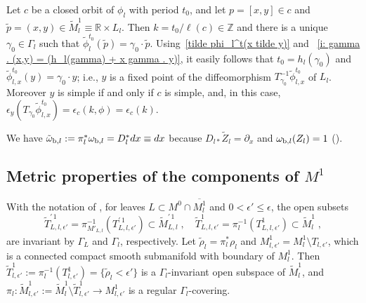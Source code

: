 \documentclass{memo-l}
\theoremstyle{plain}
\theoremstyle{definition}
\theoremstyle{remark}
\newcommand{\R}{\mathbb{R}}
\newcommand{\Z}{\mathbb{Z}}
\numberwithin{section}{chapter}
\numberwithin{equation}{section}%
\begin{document}
Let $c$ be a closed orbit of $\phi_l$ with period $t_0$, and let $p=[x,y]\in c$ and $\tilde p=(x,y)\in\widetilde M^1_l\equiv \R\times L_l$. Then $k=t_0/\ell(c)\in\Z$ and there is a unique $\gamma_0\in\Gamma_l$ such that $\tilde\phi_l^{t_0}(\tilde p)=\gamma_0\cdot\tilde p$. Using~\eqref{tilde phi_l^t(x tilde y)} and ~\ref{i: gamma . (x,y) = (h_l(gamma) + x gamma . y)}, it easily follows that $t_0=h_l(\gamma_0)$ and $\tilde\phi_{l,x}^{t_0}(y)=\gamma_0\cdot y$; i.e., $y$ is a fixed point of the diffeomorphism $T_{\gamma_0}^{-1}\tilde\phi^{t_0}_{l,x}$ of $L_l$. Moreover $y$ is simple if and only if $c$ is simple, and, in this case, $\epsilon_y(T_{\gamma_0}\tilde\phi_{l,x}^{t_0})=\epsilon_c(k,\phi)=\epsilon_c(k)$.

We have $\tilde\omega_{\text{\rm b},l}:=\pi_l^*\omega_{\text{\rm b},l}=D_l^*dx\equiv dx$ because $D_{l*}\widetilde Z_l=\partial_x$ and $\omega_{\text{\rm b},l}(Z_l)=1$ ().



\subsection{Metric properties of the components of $M^1$}\label{ss: metric properties of M^1}

With the notation of , for leaves $L\subset M^0\cap\overline{M^1_l}$ and $0<\epsilon'\le\epsilon$, the open subsets
\[
\widetilde T^{\prime\,1}_{L,l,\epsilon'}=\pi_{M'_{L,l}}^{-1}(T^{\prime\,1}_{L,l,\epsilon'})\subset\widetilde M^{\prime\,1}_{L,l}\;,\quad
\widetilde T^1_{L,l,\epsilon'}=\pi_l^{-1}(T^1_{L,l,\epsilon'})\subset\widetilde M^1_l\;,
\]
are invariant by $\Gamma_L$ and $\Gamma_l$, respectively. Let $\tilde\rho_l=\pi_l^*\rho_l$ and $M^1_{l,\epsilon'}=M^1_l\setminus T_{l,\epsilon'}$, which is a connected compact smooth submanifold with boundary of $M^1_l$. Then $\widetilde T^1_{l,\epsilon'}:=\pi_l^{-1}(T^1_{l,\epsilon'})=\{\tilde\rho_l<\epsilon'\}$ is a $\Gamma_l$-invariant open subspace of $\widetilde M^1_l$, and $\pi_l:\widetilde M^1_{l,\epsilon'}:=\widetilde M^1_l\setminus\widetilde T^1_{l,\epsilon'}\to M^1_{l,\epsilon'}$ is a regular $\Gamma_l$-covering.
\end{document}
